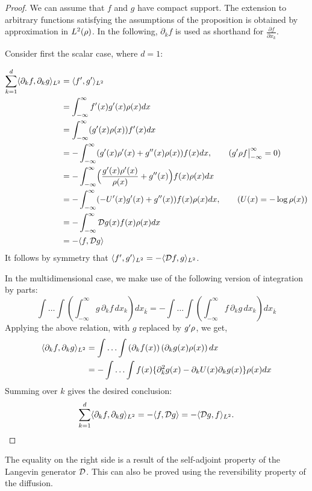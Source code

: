\begin{proof}[Proof]
	We can assume that $f$ and $g$ have compact support. The extension to arbitrary functions satisfying the assumptions of the proposition is obtained by approximation in $L^2(\rho)$. In the following, $\partial_k f$ is used as shorthand for $\frac{\partial f}{\partial x_k}$. %
	
	Consider first the scalar case, where $d=1$: 
	
	\begin{equation}
	\begin{aligned}
	\sum_{k=1}^d \langle \partial_k f,  \partial_k g\rangle_{L^2}&= \langle f', g' \rangle_{L^2}\\
	&= \int_{-\infty}^{\infty} f'(x)g'(x)\rho(x)dx \\
	&= \int_{-\infty}^{\infty} (g'(x) \rho(x)) f'(x)dx \\
	&= -\int_{-\infty}^{\infty}(g'(x) \rho'(x) +g''(x) \rho(x)) f(x) dx, \qquad{ (g'\rho f \big|_{-\infty}^{\infty}=0) }\\
	&= -\int_{-\infty}^{\infty}\Bigl(\frac{g'(x) \rho'(x)}{\rho(x)}+g''(x)\Bigr) f(x) \rho(x) dx \\
	&= -\int_{-\infty}^{\infty}(-U'(x) g'(x) + g''(x))  f(x) \rho(x) dx, \qquad ( U(x) = -\log \rho(x) )\\
	&= -\int_{-\infty}^{\infty} {\cal D} g (x) f(x) \rho(x) dx \\
	&= -\langle f, {\cal D} g \rangle
	\end{aligned}
	\end{equation}
	It follows by symmetry that $\langle f', g' \rangle_{L^2} = - \langle {\cal D} f, g \rangle_{L^2}$.  
	
	In the multidimensional case, we make use of the following version of integration by parts:
	\begin{equation}
	\int \hdots \int \left(\int_{-\infty}^{\infty} g \, \partial_k f \, dx_k\right) dx_{\bar{k}} = -\int \hdots \int \left(\int_{-\infty}^{\infty} f\, \partial_k g \, dx_k\right) dx_{\bar{k}}
	\end{equation}
	Applying the above relation, with $g$ replaced by $g'\rho$, we get, 
	\begin{equation}
	\begin{aligned}
	\langle \partial_k f, \partial_k g \rangle_{L^2} &= \int \hdots \int \left(\partial_k f(x)\right)\left(\partial_k g(x)\rho(x)\right)dx\\
	&= -\int \hdots \int f(x)\{\partial_k^2 g(x)-\partial_k U(x)\partial_k g(x)\}\rho(x)dx\\
	\end{aligned}
	\end{equation}
	Summing over $k$ gives the desired conclusion:
	\begin{equation}
	\sum_{k=1}^{d} \langle\partial_k f, \partial_k g\rangle_{L^2}= -\langle f, {\cal D} g\rangle = - \langle {\cal D} g, f \rangle_{L^2}. 
	\end{equation}
\end{proof}
The equality on the right side is a result of the self-adjoint property of the Langevin generator ${\cal D}$. This can also be proved using the reversibility property of the diffusion.
